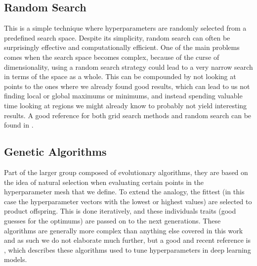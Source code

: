 \subsection{Random Search}

This is a simple technique where hyperparameters are randomly selected from a predefined search space. Despite its simplicity, random search can often be surprisingly effective and computationally efficient. One of the main problems comes when the search space becomes complex, because of the curse of dimensionality, using a random search strategy could lead to a very narrow search in terms of the space as a whole. This can be compounded by not looking at points  to the ones where we already found good results, which can lead to us not finding local or global maximums or minimums, and instead spending valuable time looking at regions we might already know to probably not yield interesting results. A good reference for both grid search methods and random search can be found in \cite{bergstra2012random}.

\subsection{Genetic Algorithms}

Part of the larger group composed of evolutionary algorithms, they are based on the idea of natural selection when evaluating certain points in the hyperparameter mesh that we define. To extend the analogy, the fittest (in this case the hyperparameter vectors with the lowest or highest values) are selected to product offspring. This is done iteratively, and these individuals traits (good guesses for the optimums) are passed on to the next generations. These algorithms are generally more complex than anything else covered in this work and as such we do not elaborate much further, but a good and recent reference is \cite{xiao2020efficient}, which describes these algorithms used to tune hyperparameters in deep learning models. 